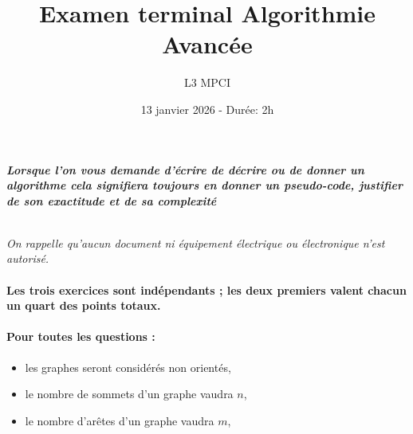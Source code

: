 \documentclass{article}
\title{Examen terminal Algorithmie Avancée}
\author{L3 MPCI}
\date{13 janvier 2026 - Durée: 2h}
\theoremstyle{exostyle}
\theoremstyle{partiestyle}
\theoremstyle{questionstyle}
\begin{document}
\maketitle

\begin{center}
{\em\bf Lorsque l'on vous demande d'écrire de décrire ou de donner un algorithme cela signifiera toujours en donner un pseudo-code, justifier de son exactitude et de sa complexité}

~\\

{\em On rappelle qu'aucun document ni équipement électrique ou électronique n'est autorisé. }
\end{center}

\paragraph*{Les trois exercices sont indépendants ; les deux premiers valent chacun un quart des points totaux.}

\paragraph*{Pour toutes les questions :}
\begin{itemize}
\item les graphes seront considérés non orientés,
\item le nombre de sommets d'un graphe vaudra $n$,
\item le nombre d'arêtes d'un graphe vaudra $m$,
\end{itemize}

\clearpage
\end{document}
